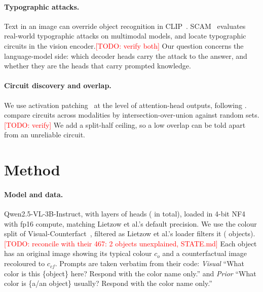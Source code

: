 \documentclass[10pt,twocolumn,letterpaper]{article}
\newcommand{\todo}[1]{\textcolor{red}{[TODO: #1]}}
\newcommand{\cco}{c_{o}}
\newcommand{\ccf}{c_{cf}}
\begin{document}
\paragraph{Typographic attacks.}
Text in an image can override object recognition in CLIP~\cite{goh2021multimodal}.
SCAM~\cite{westerhoff2025scam} evaluates real-world typographic attacks on
multimodal models, and \citet{dyslexify2025} locate typographic circuits in the
vision encoder.\todo{verify both} Our question concerns the language-model
side: which decoder heads carry the attack to the answer, and whether they are
the heads that carry prompted knowledge.

\paragraph{Circuit discovery and overlap.}
We use activation patching~\cite{meng2022rome,wang2023ioi,heimersheim2024patching}
at the level of attention-head outputs, following \citet{lietzow2026}.
\citet{nikankin2025} compare circuits across modalities by
intersection-over-union against random sets.\todo{verify} We add a split-half
ceiling, so a low overlap can be told apart from an unreliable circuit.

\section{Method}

\paragraph{Model and data.}
Qwen2.5-VL-3B-Instruct, with \nLayers{} layers of \nHeadsPerLayer{} heads
(\nHeads{} in total), loaded in 4-bit NF4~\cite{dettmers2023qlora} with fp16
compute, matching Lietzow et al.'s default precision. We use the colour split of
Visual-Counterfact~\cite{golovanevsky2025counterfact}, filtered as Lietzow et
al.'s loader filters it (\nObjects{} objects).\todo{reconcile with their 467:
2 objects unexplained, STATE.md} Each object has an original image showing its
typical colour $\cco$ and a counterfactual image recoloured to $\ccf$. Prompts
are taken verbatim from their code: \emph{Visual} ``What color is this
\{object\} here? Respond with the color name only.'' and \emph{Prior} ``What
color is \{a/an object\} usually? Respond with the color name only.''
\end{document}
